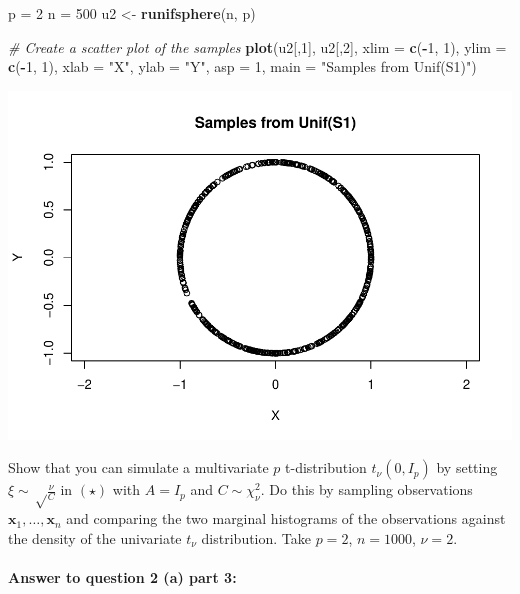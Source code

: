 \documentclass[
]{article}
\newenvironment{Shaded}{\begin{snugshade}}{\end{snugshade}}
\newcommand{\AttributeTok}[1]{\textcolor[rgb]{0.13,0.29,0.53}{#1}}
\newcommand{\CommentTok}[1]{\textcolor[rgb]{0.56,0.35,0.01}{\textit{#1}}}
\newcommand{\DecValTok}[1]{\textcolor[rgb]{0.00,0.00,0.81}{#1}}
\newcommand{\FunctionTok}[1]{\textcolor[rgb]{0.13,0.29,0.53}{\textbf{#1}}}
\newcommand{\NormalTok}[1]{#1}
\newcommand{\OtherTok}[1]{\textcolor[rgb]{0.56,0.35,0.01}{#1}}
\newcommand{\SpecialCharTok}[1]{\textcolor[rgb]{0.81,0.36,0.00}{\textbf{#1}}}
\newcommand{\StringTok}[1]{\textcolor[rgb]{0.31,0.60,0.02}{#1}}
\begin{document}
\begin{Shaded}
\begin{Highlighting}[]
\NormalTok{p }\OtherTok{=} \DecValTok{2}
\NormalTok{n }\OtherTok{=} \DecValTok{500}
\NormalTok{u2 }\OtherTok{\textless{}{-}} \FunctionTok{runifsphere}\NormalTok{(n, p)}

\CommentTok{\# Create a scatter plot of the samples}
\FunctionTok{plot}\NormalTok{(u2[,}\DecValTok{1}\NormalTok{], u2[,}\DecValTok{2}\NormalTok{], }\AttributeTok{xlim =} \FunctionTok{c}\NormalTok{(}\SpecialCharTok{{-}}\DecValTok{1}\NormalTok{, }\DecValTok{1}\NormalTok{), }\AttributeTok{ylim =} \FunctionTok{c}\NormalTok{(}\SpecialCharTok{{-}}\DecValTok{1}\NormalTok{, }\DecValTok{1}\NormalTok{), }\AttributeTok{xlab =} \StringTok{"X"}\NormalTok{, }\AttributeTok{ylab =} \StringTok{"Y"}\NormalTok{, }\AttributeTok{asp =} \DecValTok{1}\NormalTok{, }\AttributeTok{main =} \StringTok{"Samples from Unif(S1)"}\NormalTok{)}
\end{Highlighting}
\end{Shaded}

\includegraphics{A5_files/figure-latex/unnamed-chunk-15-1.pdf}

Show that you can simulate a multivariate \(p\) t-distribution
\(t_\nu(0, I_p)\) by setting \(\xi \sim \sqrt\frac{\nu}{C}\) in
\((\star)\) with \(A = I_p\) and \(C \sim \chi^2_\nu\). Do this by
sampling observations \(\mathbf{x}_1, \ldots, \mathbf{x}_n\) and
comparing the two marginal histograms of the observations against the
density of the univariate \(t_\nu\) distribution. Take \(p = 2\),
\(n = 1000\), \(\nu = 2\).

\paragraph{\texorpdfstring{\textbf{Answer to question 2 (a) part
3}:}{Answer to question 2 (a) part 3:}}\label{answer-to-question-2-a-part-3}
\end{document}
